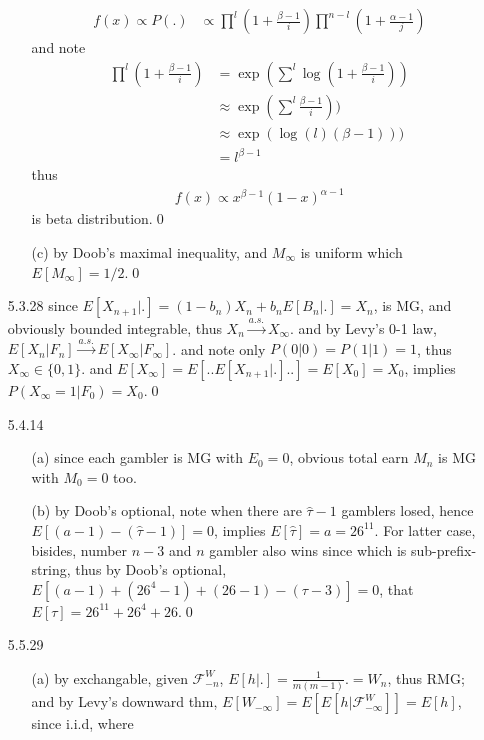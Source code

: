 \documentclass[paper=a4, fontsize=11pt]{scrartcl} %
\numberwithin{equation}{section} %
\numberwithin{figure}{section} %
\numberwithin{table}{section} %
\begin{document}
\begin{itemize}
\begin{itemize}
		\begin{align}
			f(x)\propto P(.)&\propto \prod^l (1+\frac{\beta-1}{i})\prod^{n-l} (1+\frac{\alpha-1}{j})
		\end{align}
		and note 
		\begin{align}
			\prod^l (1+\frac{\beta-1}{i}) &= \exp(\sum^l \log (1+\frac{\beta-1}{i}))\\
			&\approx \exp(\sum^l \frac{\beta-1}{i}))\\
			&\approx \exp(\log(l)(\beta-1)))\\
			&= l^{\beta-1}
		\end{align}
		thus
		\begin{align}
			f(x) \propto x^{\beta-1}(1-x)^{\alpha-1}
		\end{align}
		is beta distribution.\qed
		\item[(c)] by Doob's maximal inequality, and $M_{\infty}$ is uniform which $E[M_{\infty}]=1/2$.\qed
	\end{itemize}
	\item[5.3.28] since $E[X_{n+1}|.]= (1-b_n)X_n + b_nE[B_n|.]= X_n$, is MG, and obviously bounded integrable, thus $X_n\stackrel{a.s.}{\rightarrow} X_{\infty}$. and by Levy's 0-1 law, $E[X_n|F_n]\stackrel{a.s.}{\rightarrow} E[X_\infty|F_\infty]$. and note only $P(0|0)=P(1|1)=1$, thus $X_{\infty}\in \{0,1\}$. and $E[X_\infty]=E[..E[X_{n+1}|.]..] = E[X_0]=X_0$, implies $P(X_\infty=1|F_0)=X_0$.\qed
	\item[5.4.14]
	\begin{itemize}
		\item[(a)] since each gambler is MG with $E_0=0$, obvious total earn $M_n$ is MG with $M_0=0$ too.
		\item[(b)] by Doob's optional, note when there are $\hat{\tau}-1$ gamblers losed, hence $E[(a-1) - (\hat{\tau}-1)]=0$, implies $E[\hat{\tau}]=a=26^{11}$. For latter case, bisides, number $n-3$ and $n$ gambler also wins since which is sub-prefix-string, thus by Doob's optional, $E[(a-1)+ (26^4-1)+(26-1) - (\tau-3)]=0$, that $E[\tau]=26^{11}+26^4+26$.\qed
	\end{itemize}
	\item[5.5.29]
	\begin{itemize}
		\item[(a)] by exchangable, given $\mathcal{F}_{-n}^W$, $E[h|.]=\frac{1}{m(m-1)}.= W_n$, thus RMG; and by Levy's downward thm, $E[W_{-\infty}]=E[E[h|\mathcal{F}_{-\infty}^W]]=E[h]$, since i.i.d, where

\end{itemize}
\end{itemize}
\end{document}
